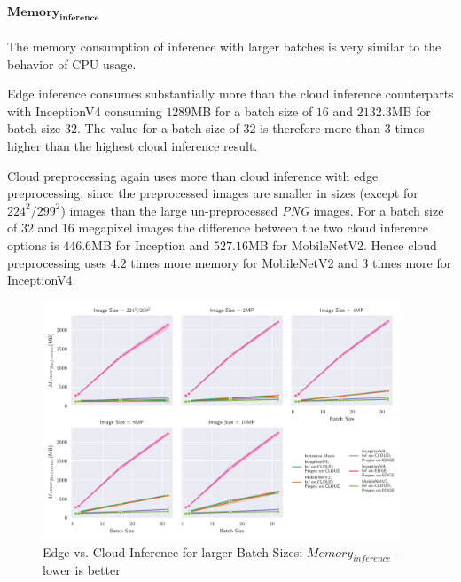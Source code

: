 \paragraph{$\mathbf{Memory_{inference}}$}
The memory consumption of inference with larger batches is very similar to the behavior of CPU usage.


Edge inference consumes substantially more than the cloud inference counterparts with InceptionV4 consuming $1289$MB for a batch size of $16$ and $2132.3$MB for batch size $32$.
The value for a batch size of $32$ is therefore more than $3$ times higher than the highest cloud inference result.

Cloud preprocessing again uses more than cloud inference with edge preprocessing, since the preprocessed images are smaller in sizes (except for $224^2/299^2$) images than the large un-preprocessed \emph{PNG} images.
For a batch size of $32$ and $16$ megapixel images the difference between the two cloud inference options is $446.6$MB for Inception and $527.16$MB for MobileNetV2.
Hence cloud preprocessing uses $4.2$ times more memory for MobileNetV2 and $3$ times more for InceptionV4.



\begin{figure}[!htb]
\centering
\includegraphics[width=0.95\textwidth]{./Bilder/single_plots/batch_size_plots/Effects_of_Batch_size_Inference_Memory.pdf}
\caption{Edge vs. Cloud Inference for larger Batch Sizes:  $Memory_{inference}$ - lower is better}
\label{fig:BatchSizeInferenceMemory}
\end{figure}


